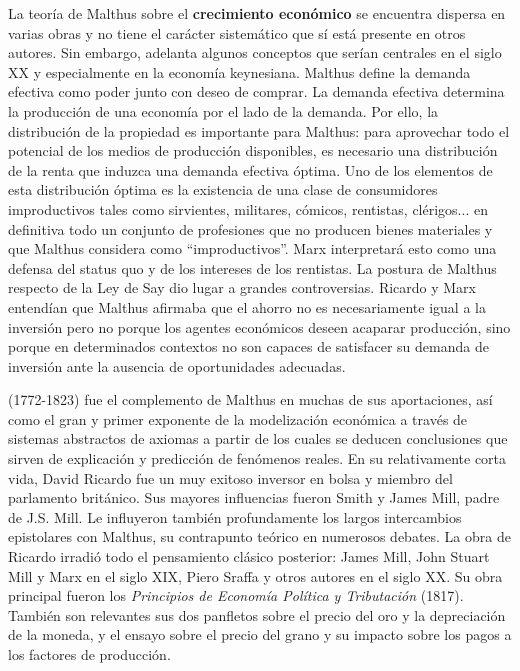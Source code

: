 \documentclass{nuevotema}
\begin{document}
La teoría de Malthus sobre el \textbf{crecimiento económico} se encuentra dispersa en varias obras y no tiene el carácter sistemático que sí está presente en otros autores. Sin embargo, adelanta algunos conceptos que serían centrales en el siglo XX y especialmente en la economía keynesiana. Malthus define la demanda efectiva como poder junto con deseo de comprar. La demanda efectiva determina la producción de una economía por el lado de la demanda. Por ello, la distribución de la propiedad es importante para Malthus: para aprovechar todo el potencial de los medios de producción disponibles, es necesario una distribución de la renta que induzca una demanda efectiva óptima. Uno de los elementos de esta distribución óptima es la existencia de una clase de consumidores improductivos tales como sirvientes, militares, cómicos, rentistas, clérigos... en definitiva todo un conjunto de profesiones que no producen bienes materiales y que Malthus considera como ``improductivos''. Marx interpretará esto como una defensa del status quo y de los intereses de los rentistas. La postura de Malthus respecto de la Ley de Say dio lugar a grandes controversias. Ricardo y Marx entendían que Malthus afirmaba que el ahorro no es necesariamente igual a la inversión pero no porque los agentes económicos deseen acaparar producción, sino porque en determinados contextos no son capaces de satisfacer su demanda de inversión ante la ausencia de oportunidades adecuadas.

 (1772-1823) fue el complemento de Malthus en muchas de sus aportaciones, así como el gran y primer exponente de la modelización económica a través de sistemas abstractos de axiomas a partir de los cuales se deducen conclusiones que sirven de explicación y predicción de fenómenos reales. En su relativamente corta vida, David Ricardo fue un muy exitoso inversor en bolsa y miembro del parlamento británico. Sus mayores influencias fueron Smith y James Mill, padre de J.S. Mill. Le influyeron también profundamente los largos intercambios epistolares con Malthus, su contrapunto teórico en numerosos debates. La obra de Ricardo irradió todo el pensamiento clásico posterior: James Mill, John Stuart Mill y Marx en el siglo XIX, Piero Sraffa y otros autores en el siglo XX. Su obra principal fueron los \textit{Principios de Economía Política y Tributación} (1817). También son relevantes sus dos panfletos sobre el precio del oro y la depreciación de la moneda, y el ensayo sobre el precio del grano y su impacto sobre los pagos a los factores de producción.
\end{document}
